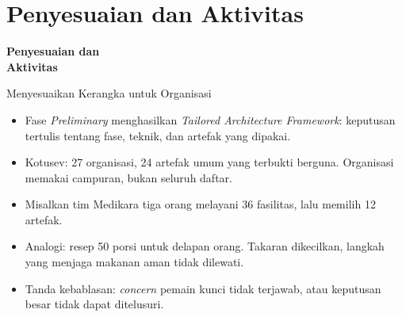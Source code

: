 \documentclass[aspectratio=169, table, 12pt]{beamer}
\begin{document}
\section{Penyesuaian dan Aktivitas}

\begin{frame}{\hfill}
  \centering
  \Huge{\textbf{Penyesuaian dan\\Aktivitas}}
\end{frame}

\begin{frame}{{\Large Menyesuaikan Kerangka untuk Organisasi}}
  \vspace{6pt}
  \small
  \begin{itemize}
    \item Fase \textit{Preliminary} menghasilkan \textit{Tailored Architecture Framework}: keputusan
          tertulis tentang fase, teknik, dan artefak yang dipakai.
    \item Kotusev: 27 organisasi, 24 artefak umum yang terbukti berguna. Organisasi memakai campuran,
          bukan seluruh daftar.
    \item Misalkan tim Medikara tiga orang melayani 36 fasilitas, lalu memilih 12 artefak.
    \item Analogi: resep 50 porsi untuk delapan orang. Takaran dikecilkan, langkah yang menjaga makanan
          aman tidak dilewati.
    \item Tanda kebablasan: \textit{concern} pemain kunci tidak terjawab, atau keputusan besar tidak dapat
          ditelusuri.
  \end{itemize}
\end{frame}
\end{document}
